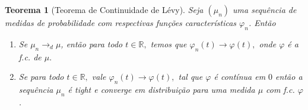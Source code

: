 \documentclass[12pt,a4paper,oneside]{book}
\newtheorem{theorem}{Teorema}[section]
\theoremstyle{definition}
\theoremstyle{remark}
\numberwithin{equation}{section}
\newcommand{\R}{\mathbb{R}}
\begin{document}
\begin{tcolorbox}

\begin{theorem}[Teorema de Continuidade de Lévy]\label{teo-cont Levy}
Seja $(\mu_n)$ uma sequência de  medidas de probabilidade com respectivas funções características $\varphi_n$. Então
\begin{enumerate}
\item Se $\mu_n \rightarrow_d \mu$, então para todo $t\in \R,$ temos que 
$\varphi_n(t)\rightarrow \varphi(t),$ onde $\varphi$ é a f.c. de $\mu.$
\item Se  para todo $t\in \R,$ vale
$\varphi_n(t)\rightarrow \varphi(t),$ tal que $\varphi$ é contínua em $0$ então a sequência $\mu_n$ é tight e converge em distribuição  para uma medida $\mu$ com f.c. $\varphi$.
\end{enumerate}

\end{theorem}
\end{tcolorbox}
\end{document}
